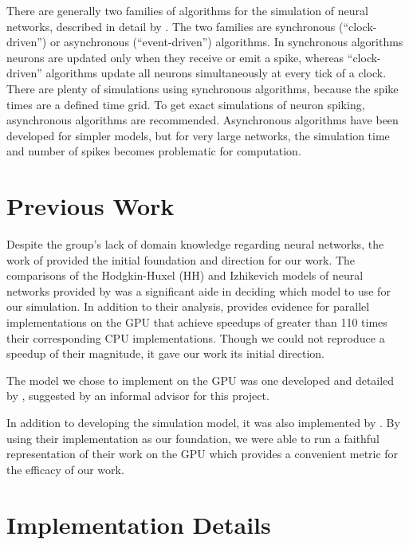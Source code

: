 \documentclass[a4paper]{article}
\begin{document}
There are generally two families of algorithms for the simulation of neural networks, described in detail by \cite{spike}. The two families are synchronous (“clock-driven”) or asynchronous (“event-driven”) algorithms. In synchronous algorithms neurons are updated only when they receive or emit a spike, whereas “clock-driven” algorithms update all neurons simultaneously at every tick of a clock. There are plenty of simulations using synchronous algorithms, because the spike times are a defined time grid. To get exact simulations of neuron spiking, asynchronous algorithms are recommended. Asynchronous algorithms have been developed for simpler models, but for very large networks, the simulation time and number of spikes becomes problematic for computation.


\section{Previous Work}
Despite the group's lack of domain knowledge regarding neural networks, the work of \cite{accel} provided the initial foundation and direction for our work. The comparisons of the Hodgkin-Huxel (HH) and Izhikevich models of neural networks provided by \cite{accel} was a significant aide in deciding which model to use for our simulation. In addition to their analysis, \cite{accel} provides evidence for parallel implementations on the GPU that achieve speedups of greater than 110 times their corresponding CPU implementations. Though we could not reproduce a speedup of their magnitude, it gave our work its initial direction.

The model we chose to implement on the GPU was one developed and detailed by \cite{synfire}, suggested by an informal advisor for this project.

In addition to developing the simulation model, it was also implemented by \cite{synfire}. By using their implementation as our foundation, we were able to run a faithful representation of their work on the GPU which provides a convenient metric for the efficacy of our work.




\section{Implementation Details}
\end{document}
